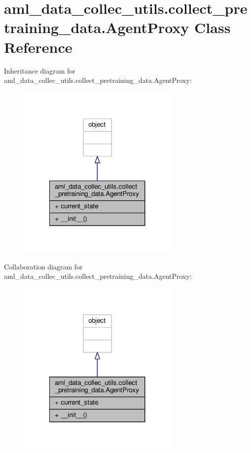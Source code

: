 \hypertarget{classaml__data__collec__utils_1_1collect__pretraining__data_1_1_agent_proxy}{\section{aml\-\_\-data\-\_\-collec\-\_\-utils.\-collect\-\_\-pretraining\-\_\-data.\-Agent\-Proxy Class Reference}
\label{classaml__data__collec__utils_1_1collect__pretraining__data_1_1_agent_proxy}
}


Inheritance diagram for aml\-\_\-data\-\_\-collec\-\_\-utils.\-collect\-\_\-pretraining\-\_\-data.\-Agent\-Proxy\-:\nopagebreak
\begin{figure}[H]
\begin{center}
\leavevmode
\includegraphics[width=224pt]{classaml__data__collec__utils_1_1collect__pretraining__data_1_1_agent_proxy__inherit__graph}
\end{center}
\end{figure}


Collaboration diagram for aml\-\_\-data\-\_\-collec\-\_\-utils.\-collect\-\_\-pretraining\-\_\-data.\-Agent\-Proxy\-:\nopagebreak
\begin{figure}[H]
\begin{center}
\leavevmode
\includegraphics[width=224pt]{classaml__data__collec__utils_1_1collect__pretraining__data_1_1_agent_proxy__coll__graph}
\end{center}
\end{figure}
